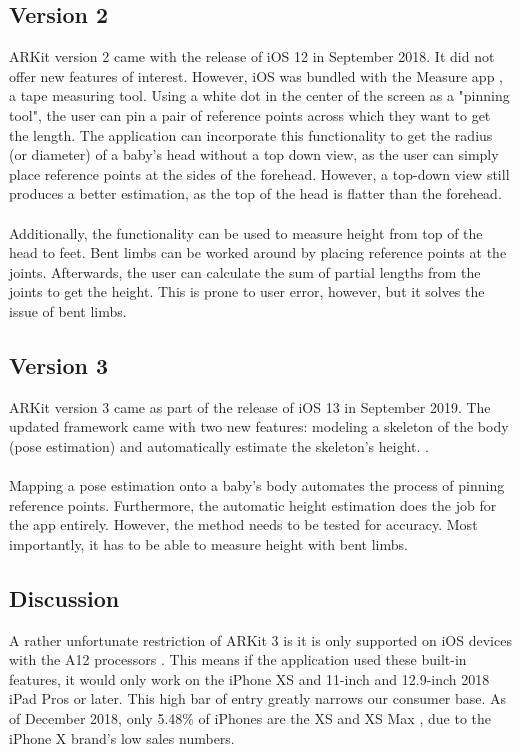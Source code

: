 \documentclass[onecolumn, draftclsnofoot,10pt, compsoc]{IEEEtran}
\begin{document}
\subsection{Version 2}
ARKit version 2 came with the release of iOS 12 in September 2018.
It did not offer new features of interest. However, iOS was bundled with the Measure app \cite{measure_app}, a tape measuring tool.
Using a white dot in the center of the screen as a "pinning tool", the user can pin a pair of reference points across which they want to get the length.
The application can incorporate this functionality to get the radius (or diameter) of a baby's head without a top down view, as the user can simply place reference points at the sides of the forehead.
However, a top-down view still produces a better estimation, as the top of the head is flatter than the forehead.
\\\\
Additionally, the functionality can be used to measure height from top of the head to feet. Bent limbs can be worked around by placing reference points at the joints.
Afterwards, the user can calculate the sum of partial lengths from the joints to get the height. This is prone to user error, however, but it solves the issue of bent limbs.

\subsection{Version 3}
ARKit version 3 came as part of the release of iOS 13 in September 2019. The updated framework came with two new features: modeling a skeleton of the body (pose estimation) \cite{ARBody2D} and automatically estimate the skeleton's height. \cite{automaticSkeletonScaleEstimationEnabled}.
\\\\
Mapping a pose estimation onto a baby's body automates the process of pinning reference points. Furthermore, the automatic height estimation does the job for the app entirely.
However, the method needs to be tested for accuracy.
Most importantly, it has to be able to measure height with bent limbs.

\subsection{Discussion}
A rather unfortunate restriction of ARKit 3 is it is only supported on iOS devices with the A12 processors \cite{ARKit3_A12_processor}.
This means if the application used these built-in features, it would only work on the iPhone XS and 11-inch and 12.9-inch 2018 iPad Pros or later.
This high bar of entry greatly narrows our consumer base. As of December 2018, only 5.48\% of iPhones are the XS and XS Max \cite{iPhone_percentage}, due to the iPhone X brand's low sales numbers.
\end{document}
